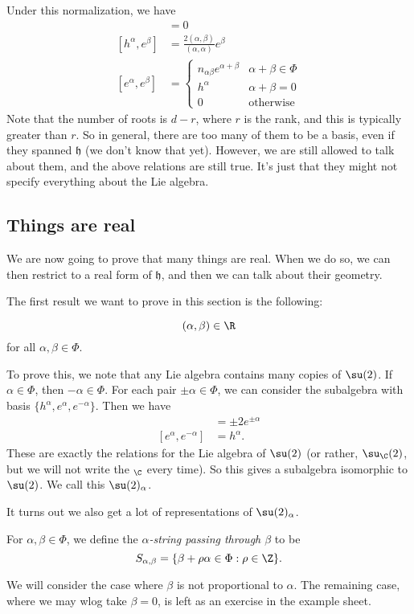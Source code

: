 \documentclass[a4paper]{article}
\begin{document}
Under this normalization, we have
\begin{align*}
  [h^\alpha, h^\beta] &= 0\\
  [h^\alpha, e^\beta] &= \frac{2(\alpha, \beta)}{(\alpha, \alpha)} e^\beta\\
  [e^\alpha, e^\beta] &=
  \begin{cases}
    n_{\alpha\beta} e^{\alpha + \beta} & \alpha + \beta \in \Phi\\
    h^\alpha & \alpha + \beta = 0\\
    0 & \text{otherwise}
  \end{cases}
\end{align*}
Note that the number of roots is $d - r$, where $r$ is the rank, and this is typically greater than $r$. So in general, there are too many of them to be a basis, even if they spanned $\mathfrak{h}$ (we don't know that yet). However, we are still allowed to talk about them, and the above relations are still true. It's just that they might not specify everything about the Lie algebra.

\subsection{Things are real}
We are now going to prove that many things are real. When we do so, we can then restrict to a real form of $\mathfrak{h}$, and then we can talk about their geometry.

The first result we want to prove in this section is the following:
\begin{thm}
  \[
    (\alpha, \beta) \in \R
  \]
  for all $\alpha, \beta \in \Phi$.
\end{thm}

To prove this, we note that any Lie algebra contains many copies of $\su(2)$. If $\alpha \in \Phi$, then $-\alpha \in \Phi$. For each pair $\pm \alpha \in \Phi$, we can consider the subalgebra with basis $\{h^\alpha, e^\alpha, e^{-\alpha}\}$. Then we have
\begin{align*}
  [h^\alpha, e^{\pm \alpha}] &= \pm 2 e^{\pm \alpha}\\
  [e^{\alpha}, e^{-\alpha}] &= h^\alpha.
\end{align*}
These are exactly the relations for the Lie algebra of $\su(2)$ (or rather, $\su_\C(2)$, but we will not write the $_\C$ every time). So this gives a subalgebra isomorphic to $\su(2)$. We call this $\su(2)_\alpha$.

It turns out we also get a lot of representations of $\su(2)_\alpha$.
\begin{defi}[String]
  For $\alpha, \beta \in \Phi$, we define the \emph{$\alpha$-string passing through $\beta$} to be
  \[
    S_{\alpha, \beta} = \{\beta + \rho\alpha \in \Phi: \rho \in \Z\}.
  \]
\end{defi}
We will consider the case where $\beta$ is not proportional to $\alpha$. The remaining case, where we may wlog take $\beta = 0$, is left as an exercise in the example sheet.
\end{document}

